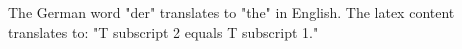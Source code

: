 The German word "der" translates to "the" in English. The latex content translates to: "T subscript 2 equals T subscript 1."